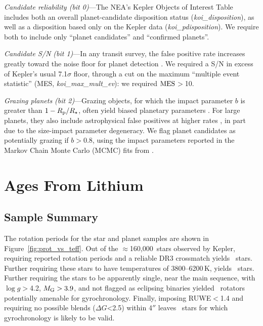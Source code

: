 \documentclass[11pt,twocolumn,tighten]{aastex63}
\newcommand{\nkeplerstars}{$\approx$160{,}000}
\begin{document}
{\it Candidate reliability (bit 0)}---The NEA's Kepler Objects of
Interest Table includes both an overall planet-candidate disposition
status ({\it koi\_disposition}), as well as a disposition based only
on the Kepler data ({\it koi\_pdisposition}).  We require both to
include only ``planet candidates'' and ``confirmed planets''. 

{\it Candidate S/N (bit 1)}---In any transit survey, the false
positive rate increases greatly toward the noise floor for planet
detection \citep[e.g.][]{2002ApJ...564..495J}.  We required a S/N in
excess of Kepler's usual 7.1$\sigma$ floor, through a cut on the
maximum ``multiple event statistic'' (MES, {\it koi\_max\_mult\_ev}):
we required ${\rm MES}$$>$10.

{\it Grazing planets (bit 2)}---Grazing objects, for which the impact
parameter $b$ is greater than $1-R_{\rm p}/R_\star$, often yield
biased planetary parameters \citep[e.g.][]{2022AJ....163..111G}.  For
large planets, they also include astrophysical false positives at
higher rates \citep{2016ApJ...822...86M}, in part due to the
size-impact parameter degeneracy.  We flag planet candidates as
potentially grazing if $b$$>$0.8, using the impact parameters reported
in the Markov Chain Monte Carlo (MCMC) fits from
\citet{Thompson_2018}.




\section{Ages From Lithium}
\label{sec:liage} 
\subsection{Sample Summary}
\label{subsec:tally}

The rotation periods for the star and planet samples are shown in
Figure~\ref{fig:prot_vs_teff}.  Out of the \nkeplerstars\ stars
observed by Kepler, requiring reported rotation periods and a reliable
DR3 crossmatch yields \nuniqstarsantosrot\ stars.  Further requiring
these stars to have temperatures of 3800--6200\,K, yields
\nuniqstarsantosrotteffcut\ stars.  Further requiring the stars to be
apparently single, near the main sequence, with $\log g$$>$4.2,
$M_{\rm G}>3.9$, and not flagged as eclipsing binaries yielded
\nuniqstarsantosallbutruwe\ rotators potentially amenable for
gyrochronology.  Finally, imposing RUWE$<$1.4 and requiring no
possible blends ($\Delta G$<2.5) within 4$''$ leaves
\nuniqstarsantosrotgyroappl\ stars for which gyrochronology is likely
to be valid.
\end{document}
